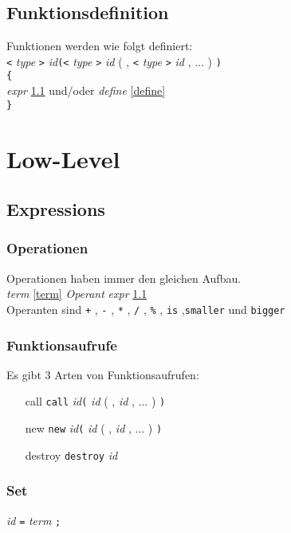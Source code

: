 \documentclass{article}
\begin{document}
\subsection{Funktionsdefinition} \label{function}
Funktionen werden wie folgt definiert: \\
\texttt{<} \textit{type} \texttt{>} \textit{id}\texttt{(<} \textit{type} \texttt{>} \textit{id}  {\small( , \texttt{<} \textit{type} \texttt{>} \textit{id} , ... )} \texttt{)}\\
\texttt{\{}\\
\textit{expr} {\tiny\ref{expr}} und/oder \textit{define} {\tiny\ref{define}}\\
\texttt{\}}


\section{Low-Level}

\subsection{Expressions} \label{expr}
\subsubsection{Operationen}
Operationen haben immer den gleichen Aufbau.\\
\textit{term} {\tiny\ref{term}} \textit{Operant} \textit{expr} {\tiny\ref{expr}}\\
Operanten sind \texttt{+} , \texttt{-} , \texttt{*} , \texttt{/} , \texttt{\%} , \texttt{is} ,\texttt{smaller} und \texttt{bigger} 

\subsubsection{Funktionsaufrufe}
Es gibt 3 Arten von Funktionsaufrufen:
\begin{itemize}
\item[call]{\texttt{call} \textit{id}\texttt{(} \textit{id}  {\tiny( , \textit{id} , ... )} \texttt{)} }
\item[new]{\texttt{new} \textit{id}\texttt{(} \textit{id}  {\tiny( , \textit{id} , ... )} \texttt{)} }
\item[destroy]{\texttt{destroy} \textit{id}}
\end{itemize}

\subsubsection{Set}
\textit{id} \texttt{=} \textit{term} \texttt{;}
\end{document}
